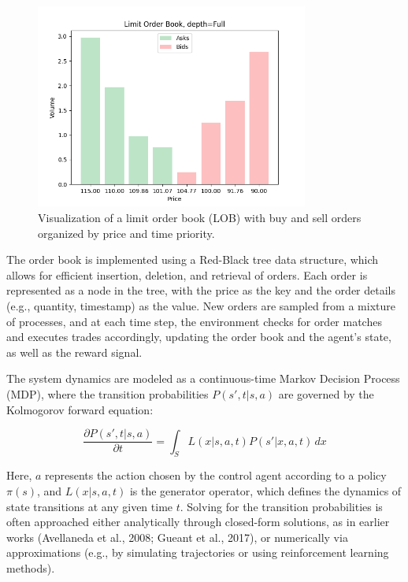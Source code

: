 \documentclass[11pt]{article}
\begin{document}
    \begin{figure}[htb]
        \centering
        \includegraphics[width=0.8\textwidth]{images/lob}
        \caption{Visualization of a limit order book (LOB) with buy and sell orders organized by price and time priority.}
        \label{fig:lob}
    \end{figure}

    The order book is implemented using a Red-Black tree data structure, which allows for efficient insertion, deletion, and retrieval of orders.
    Each order is represented as a node in the tree, with the price as the key and the order details (e.g., quantity, timestamp) as the value.
    New orders are sampled from a mixture of processes, and at each time step, the environment checks for order matches and executes trades accordingly,
    updating the order book and the agent's state, as well as the reward signal.

    The system dynamics are modeled as a continuous-time Markov Decision Process (MDP), where the transition probabilities
    \( P(s', t|s, a) \) are governed by the Kolmogorov forward equation:

    \[
        \frac{\partial P(s', t|s, a)}{\partial t} = \int_S L(x|s, a, t) P(s'|x, a, t) \, dx
    \]

    Here, \( a \) represents the action chosen by the control agent according to a policy \( \pi(s) \), and \( L(x|s, a, t) \) is the generator operator,
    which defines the dynamics of state transitions at any given time \( t \).
    Solving for the transition probabilities is often approached either analytically through closed-form solutions,
    as in earlier works (Avellaneda et al., 2008; Gueant et al., 2017),
    or numerically via approximations (e.g., by simulating trajectories or using reinforcement learning methods).
\end{document}

